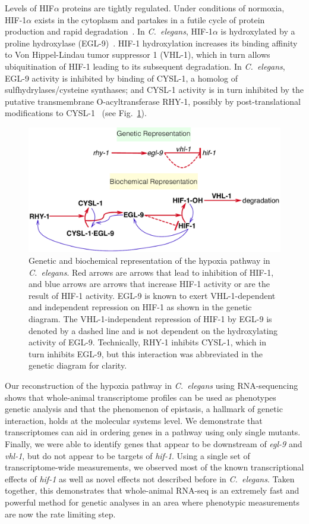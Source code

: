 \documentclass[9pt,twocolumn,twoside]{pnas-new}
\newcommand{\cel}{\emph{C.~elegans}}
\newcommand{\gene}[1]{\mbox{\emph{#1}}}
\newcommand{\eglp}{EGL-9}
\newcommand{\rhyp}{RHY-1}
\newcommand{\vhlp}{VHL-1}
\newcommand{\hifp}{HIF-1}
\newcommand{\cyslp}{CYSL-1}
\begin{document}
Levels of HIF$\alpha$ proteins are tightly regulated. Under conditions of
normoxia, \hifp{}$\alpha$ exists in the cytoplasm and partakes in a futile cycle
of protein production and rapid degradation~\cite{Huang1996}. In \cel{},
\hifp{}$\alpha$ is hydroxylated by a proline hydroxylase
(\eglp{})~\cite{Kaelin2008}. \hifp{} hydroxylation increases its binding
affinity to Von Hippel-Lindau tumor suppressor 1 (\vhlp{}), which in turn allows
ubiquitination of \hifp{} leading to its subsequent degradation. In \cel{},
\eglp{} activity is inhibited by binding of \cyslp{}, a homolog of
sulfhydrylases/cysteine synthases; and \cyslp{} activity is in turn inhibited by
the putative transmembrane O-acyltransferase \rhyp{}, possibly by
post-translational modifications to \cyslp{}~\cite{Ma2012} (see
Fig.~\ref{fig:pathway}).

\begin{figure}[tbhp]
  \centering
  \includegraphics[width=\linewidth]{../figs/HIF1pathway.pdf}
  \caption{
    Genetic and biochemical representation of the hypoxia pathway in \cel{}. Red
    arrows are arrows that lead to inhibition of \hifp{}, and blue arrows are
    arrows that increase \hifp{} activity or are the result of \hifp{} activity.
    \eglp{} is known to exert \vhlp{}-dependent and independent repression
    on \hifp{} as shown in the genetic diagram. The \vhlp{}-independent
    repression of \hifp{} by \eglp{} is denoted by a dashed line and is not
    dependent on the hydroxylating activity of \eglp{}. Technically, RHY-1
    inhibits CYSL-1, which in turn inhibits EGL-9, but this interaction was
    abbreviated in the genetic diagram for clarity.
  }
\label{fig:pathway}
\end{figure}

Our reconstruction of the hypoxia pathway in \cel{} using RNA-sequencing shows
that whole-animal transcriptome profiles can be used as phenotypes genetic
analysis and that the phenomenon of epistasis, a hallmark of genetic
interaction, holds at the molecular systems level. We demonstrate that
transcriptomes can aid in ordering genes in a pathway using only single mutants.
Finally, we were able to identify genes that appear to be downstream of
\gene{egl-9} and \gene{vhl-1}, but do not appear to be targets of \gene{hif-1}.
Using a single set of transcriptome-wide measurements, we observed most of the
known transcriptional effects of \gene{hif-1} as well as novel effects not
described before in \cel{}. Taken together, this demonstrates that whole-animal
RNA-seq is an extremely fast and powerful method for genetic analyses in an area
where phenotypic measurements are now the rate limiting step.
\end{document}
